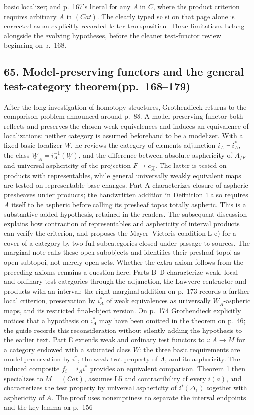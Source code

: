 \documentclass[10pt,oneside]{book}
\begin{document}
basic localizer; and p.~167's literal for any $A$ in $C$, where the product criterion requires arbitrary $A$ in $(Cat)$. The clearly typed so si on that page alone is corrected as an explicitly recorded letter transposition. These limitations belong alongside the evolving hypotheses, before the cleaner test-functor review beginning on p.~168.

\subsection*{65. Model-preserving functors and the general test-category theorem\newline (pp.~168--179)}
After the long investigation of homotopy structures, Grothendieck returns to the comparison problem announced around p.~88. A model-preserving functor both reflects and preserves the chosen weak equivalences and induces an equivalence of localizations; neither category is assumed beforehand to be a modelizer. With a fixed basic localizer $\underline W$, he reviews the category-of-elements adjunction $i_A\dashv i_A^*$, the class $\underline W_A=i_A^{-1}(\underline W)$, and the difference between absolute asphericity of $A_{/F}$ and universal asphericity of the projection $F\to e_{\widehat A}$. The latter is tested on products with representables, while general universally weakly equivalent maps are tested on representable base changes. Part A characterizes closure of aspheric presheaves under products; the handwritten addition in Definition 1 also requires $A$ itself to be aspheric before calling its presheaf topos totally aspheric. This is a substantive added hypothesis, retained in the readers. The subsequent discussion explains how contraction of representables and asphericity of interval products can verify the criterion, and proposes the Mayer--Vietoris condition L e) for a cover of a category by two full subcategories closed under passage to sources. The marginal note calls these open subobjects and identifies their presheaf topoi as open subtopoi, not merely open sets. Whether the extra axiom follows from the preceding axioms remains a question here. Parts B--D characterize weak, local and ordinary test categories through the adjunction, the Lawvere contractor and products with an interval; the right marginal addition on p.~173 records a further local criterion, preservation by $i_A^*$ of weak equivalences as universally $\underline W_A$-aspheric maps, and its restricted final-object version. On p.~174 Grothendieck explicitly notices that a hypothesis on $i_A^*$ may have been omitted in the theorem on p.~46; the guide records this reconsideration without silently adding the hypothesis to the earlier text. Part E extends weak and ordinary test functors to $i:A\to M$ for a category endowed with a saturated class $W$: the three basic requirements are model preservation by $i^*$, the weak-test property of $A$, and its asphericity. The induced composite $f_i=i_Ai^*$ provides an equivalent comparison. Theorem 1 then specializes to $M=(Cat)$, assumes L5 and contractibility of every $i(a)$, and characterizes the test property by universal asphericity of $i^*(\Delta_1)$ together with asphericity of $A$. The proof uses nonemptiness to separate the interval endpoints and the key lemma on p.~156 
\end{document}
